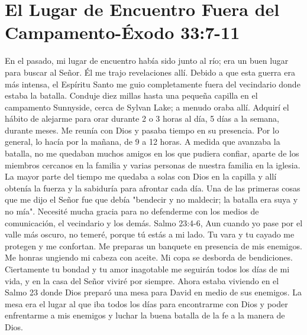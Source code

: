 \documentclass[twoside, 12pt]{book}
\begin{document}
 
\section{El Lugar de Encuentro Fuera del Campamento-Éxodo 33:7-11}

En el pasado, mi lugar de encuentro había sido junto al río; era un buen lugar para buscar al Señor. Él me trajo revelaciones allí. Debido a que esta guerra era más intensa, el Espíritu Santo me guio completamente fuera del vecindario donde estaba la batalla. Conduje diez millas hasta una pequeña capilla en el campamento Sunnyside, cerca de Sylvan Lake; a menudo oraba allí. Adquirí el hábito de alejarme para orar durante 2 o 3 horas al día, 5 días a la semana, durante meses. Me reunía con Dios y pasaba tiempo en su presencia. Por lo general, lo hacía por la mañana, de 9 a 12 horas. A medida que avanzaba la batalla, no me quedaban muchos amigos en los que pudiera confiar, aparte de los miembros cercanos en la familia y varias personas de nuestra familia en la iglesia. La mayor parte del tiempo me quedaba a solas con Dios en la capilla y allí obtenía la fuerza y la sabiduría para afrontar cada día. Una de las primeras cosas que me dijo el Señor fue que debía "bendecir y no maldecir; la batalla era suya y no mía". Necesité mucha gracia para no defenderme con los medios de comunicación, el vecindario y los demás.
Salmo 23:4-6, Aun cuando yo pase por el valle más oscuro, no temeré, porque tú estás a mi lado. Tu vara y tu cayado me protegen y me confortan. Me preparas un banquete en presencia de mis enemigos. Me honras ungiendo mi cabeza con aceite. Mi copa se desborda de bendiciones. Ciertamente tu bondad y tu amor inagotable me seguirán todos los días de mi vida, y en la casa del Señor viviré por siempre. Ahora estaba viviendo en el Salmo 23 donde Dios preparó una mesa para David en medio de sus enemigos. La mesa era el lugar al que iba todos los días para encontrarme con Dios y poder enfrentarme a mis enemigos y luchar la buena batalla de la fe a la manera de Dios.\\
\end{document}
